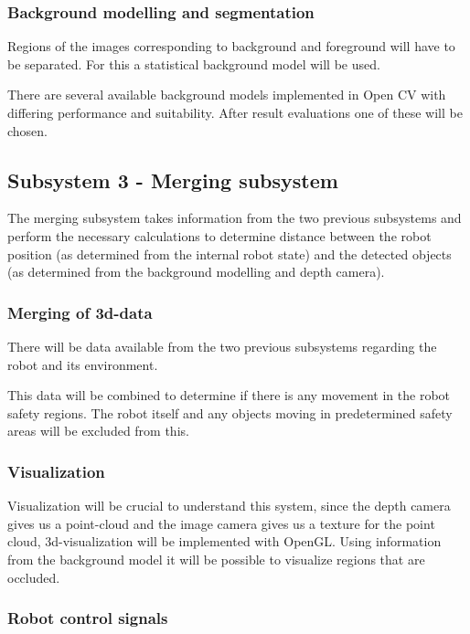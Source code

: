 \documentclass[10pt,a4paper,twocolumn,english]{article}
\begin{document}
\subsubsection{Background modelling and segmentation}

Regions of the images corresponding to background and foreground will have to be separated. For this a statistical background model will be used.

There are several available background models implemented in Open CV with differing performance and suitability. After result evaluations one of these will be chosen.

\subsection{Subsystem 3 - Merging subsystem}

The merging subsystem takes information from the two previous subsystems and perform the necessary calculations to determine distance between the robot position (as determined from the internal robot state) and the detected objects (as determined from the background modelling and depth camera).

\subsubsection{Merging of 3d-data}

There will be data available from the two previous subsystems regarding the robot and its environment. 

This data will be combined to determine if there is any movement in the robot safety regions. The robot itself and any objects moving in predetermined safety areas will be excluded from this.

\subsubsection{Visualization}

Visualization will be crucial to understand this system, since the depth camera gives us a point-cloud and the image camera gives us a texture for the point cloud, 3d-visualization will be implemented with OpenGL. Using information from the background model it will be possible to visualize regions that are occluded.

\subsubsection{Robot control signals}
\end{document}
